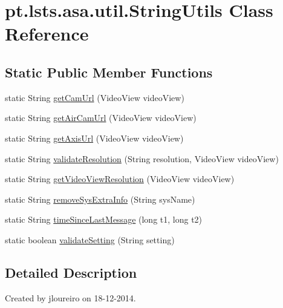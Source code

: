 \hypertarget{classpt_1_1lsts_1_1asa_1_1util_1_1StringUtils}{}\section{pt.\+lsts.\+asa.\+util.\+String\+Utils Class Reference}
\label{classpt_1_1lsts_1_1asa_1_1util_1_1StringUtils}
\subsection*{Static Public Member Functions}
\begin{DoxyCompactItemize}
\item 
static String \hyperlink{classpt_1_1lsts_1_1asa_1_1util_1_1StringUtils_a7cbe98c87a5a0997c99eb34c9668ee09}{get\+Cam\+Url} (Video\+View video\+View)
\item 
static String \hyperlink{classpt_1_1lsts_1_1asa_1_1util_1_1StringUtils_a243f6571bb6d802b26deec02a9821247}{get\+Air\+Cam\+Url} (Video\+View video\+View)
\item 
static String \hyperlink{classpt_1_1lsts_1_1asa_1_1util_1_1StringUtils_a14845f4aaef8932f66ad5c301bc65cc0}{get\+Axis\+Url} (Video\+View video\+View)
\item 
static String \hyperlink{classpt_1_1lsts_1_1asa_1_1util_1_1StringUtils_a9e705ad60a86442fcf858e7172730123}{validate\+Resolution} (String resolution, Video\+View video\+View)
\item 
static String \hyperlink{classpt_1_1lsts_1_1asa_1_1util_1_1StringUtils_a2bacbe07d0e05a972d6fdfae0b2b2f86}{get\+Video\+View\+Resolution} (Video\+View video\+View)
\item 
static String \hyperlink{classpt_1_1lsts_1_1asa_1_1util_1_1StringUtils_a43ff1dcc3e8e861f57a432a1c918294b}{remove\+Sys\+Extra\+Info} (String sys\+Name)
\item 
static String \hyperlink{classpt_1_1lsts_1_1asa_1_1util_1_1StringUtils_a02717127427e23bf10d84df838599977}{time\+Since\+Last\+Message} (long t1, long t2)
\item 
static boolean \hyperlink{classpt_1_1lsts_1_1asa_1_1util_1_1StringUtils_a4886e8d0f1a6e6d08171b090d3862dcd}{validate\+Setting} (String setting)
\end{DoxyCompactItemize}


\subsection{Detailed Description}
Created by jloureiro on 18-\/12-\/2014. 

